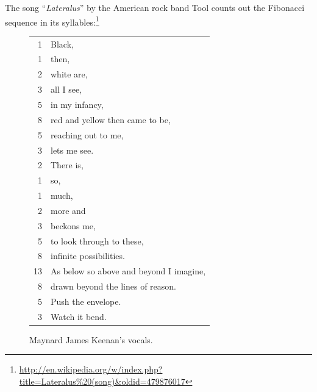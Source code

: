 The song ``\emph{Lateralus}'' by the American rock band Tool counts out the Fibonacci sequence in its syllables:\footnote{\url{http://en.wikipedia.org/w/index.php?title=Lateralus\%20(song)&oldid=479876017}}
\begin{figure}[H]
\begin{tabular}{r|l}
1 & Black,                 \\
1 & then,                  \\
2 & white are,             \\
3 & all I see,             \\
5 & in my infancy,       \\
8 & red and yellow then came to be,             \\
5 & reaching out to me,   \\
3 & lets me see.           \\
2 & There is,              \\
1 & so,                    \\
1 & much,                  \\
2 & more and               \\
3 & beckons me,           \\
5 & to look through to these,                    \\
8 & infinite possibilities.                \\
13 & As below so above and beyond I imagine,\\
8 & drawn beyond the lines of reason.\\
5 & Push the envelope. \\
3 & Watch it bend. \\
\end{tabular}
\caption{ Maynard James Keenan's vocals.}
\end{figure}

